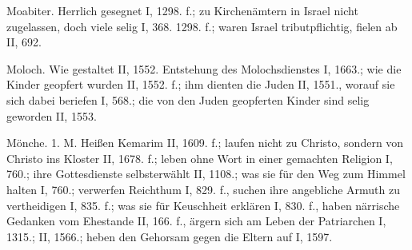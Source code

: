 Moabiter. Herrlich gesegnet I, 1298. f.; zu Kirchenämtern in Israel nicht zugelassen, doch viele selig I, 368. 1298. f.; waren Israel tributpflichtig, fielen ab II, 692.

Moloch. Wie gestaltet II, 1552. Entstehung des Molochsdienstes I, 1663.; wie die Kinder geopfert wurden II, 1552. f.; ihm dienten die Juden II, 1551., worauf sie sich dabei beriefen I, 568.; die von den Juden geopferten Kinder sind selig geworden II, 1553.

Mönche. 1.  M. Heißen Kemarim II, 1609. f.; laufen nicht zu Christo, sondern von Christo ins Kloster II, 1678. f.; leben ohne Wort in einer gemachten Religion I, 760.; ihre Gottesdienste selbsterwählt II, 1108.; was sie für den Weg zum Himmel halten I, 760.; verwerfen Reichthum I, 829. f., suchen ihre angebliche Armuth zu vertheidigen I, 835. f.; was sie für Keuschheit erklären I, 830. f., haben närrische Gedanken vom Ehestande II, 166. f., ärgern sich am Leben der Patriarchen I, 1315.; II, 1566.; heben den Gehorsam gegen die Eltern auf I, 1597.

